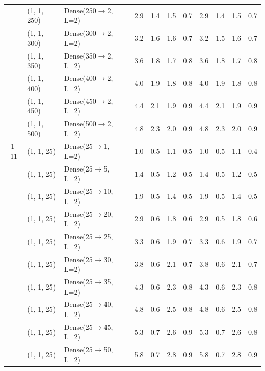 \begin{tabular}{cllcccccccc}
 & (1, 1, 250) & Dense(250$\to$2, L=2) & 2.9 & 1.4 & 1.5 & 0.7 & 2.9 & 1.4 & 1.5 & 0.7 \\
 & (1, 1, 300) & Dense(300$\to$2, L=2) & 3.2 & 1.6 & 1.6 & 0.7 & 3.2 & 1.5 & 1.6 & 0.7 \\
 & (1, 1, 350) & Dense(350$\to$2, L=2) & 3.6 & 1.8 & 1.7 & 0.8 & 3.6 & 1.8 & 1.7 & 0.8 \\
 & (1, 1, 400) & Dense(400$\to$2, L=2) & 4.0 & 1.9 & 1.8 & 0.8 & 4.0 & 1.9 & 1.8 & 0.8 \\
 & (1, 1, 450) & Dense(450$\to$2, L=2) & 4.4 & 2.1 & 1.9 & 0.9 & 4.4 & 2.1 & 1.9 & 0.9 \\
 & (1, 1, 500) & Dense(500$\to$2, L=2) & 4.8 & 2.3 & 2.0 & 0.9 & 4.8 & 2.3 & 2.0 & 0.9 \\
\cmidrule(lr){1-11}
\multirow{10}{*}{\rotatebox[origin=c]{90}{Output Size}} & (1, 1, 25) & Dense(25$\to$1, L=2) & 1.0 & 0.5 & 1.1 & 0.5 & 1.0 & 0.5 & 1.1 & 0.4 \\
 & (1, 1, 25) & Dense(25$\to$5, L=2) & 1.4 & 0.5 & 1.2 & 0.5 & 1.4 & 0.5 & 1.2 & 0.5 \\
 & (1, 1, 25) & Dense(25$\to$10, L=2) & 1.9 & 0.5 & 1.4 & 0.5 & 1.9 & 0.5 & 1.4 & 0.5 \\
 & (1, 1, 25) & Dense(25$\to$20, L=2) & 2.9 & 0.6 & 1.8 & 0.6 & 2.9 & 0.5 & 1.8 & 0.6 \\
 & (1, 1, 25) & Dense(25$\to$25, L=2) & 3.3 & 0.6 & 1.9 & 0.7 & 3.3 & 0.6 & 1.9 & 0.7 \\
 & (1, 1, 25) & Dense(25$\to$30, L=2) & 3.8 & 0.6 & 2.1 & 0.7 & 3.8 & 0.6 & 2.1 & 0.7 \\
 & (1, 1, 25) & Dense(25$\to$35, L=2) & 4.3 & 0.6 & 2.3 & 0.8 & 4.3 & 0.6 & 2.3 & 0.8 \\
 & (1, 1, 25) & Dense(25$\to$40, L=2) & 4.8 & 0.6 & 2.5 & 0.8 & 4.8 & 0.6 & 2.5 & 0.8 \\
 & (1, 1, 25) & Dense(25$\to$45, L=2) & 5.3 & 0.7 & 2.6 & 0.9 & 5.3 & 0.7 & 2.6 & 0.8 \\
 & (1, 1, 25) & Dense(25$\to$50, L=2) & 5.8 & 0.7 & 2.8 & 0.9 & 5.8 & 0.7 & 2.8 & 0.9 \\
\bottomrule
\end{tabular}